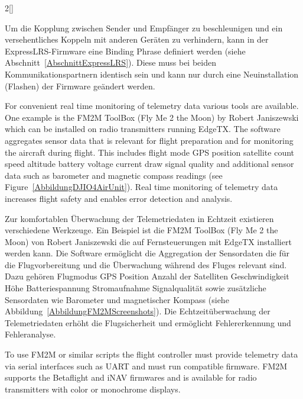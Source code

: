 \begin{paracol}{2}[]
\colger

Um die Kopplung zwischen Sender und Empfänger zu beschleunigen und ein versehentliches Koppeln mit anderen Geräten zu verhindern, kann in der ExpressLRS-Firmware eine Binding Phrase definiert werden (siehe Abschnitt~\ref{AbschnittExpressLRS}). Diese muss bei beiden Kommunikationspartnern identisch sein und kann nur durch eine Neuinstallation (Flashen) der Firmware geändert werden.

\colende

\renewcommand{\deutschertitel}{Überwachung der Telemetriedaten mit geeigneten Werkzeugen}
\renewcommand{\englischertitel}{Monitoring telemetry data with suitable tools}
\makroabschnitt
\label{AbschnittTelemetriedatenFM2MToolBox}

For convenient real time monitoring of telemetry data various tools are available. One example is the FM2M ToolBox (Fly Me 2 the Moon) by Robert Janiszewski which can be installed on radio transmitters running EdgeTX. The software aggregates sensor data that is relevant for flight preparation and for monitoring the aircraft during flight. This includes flight mode GPS position satellite count speed altitude battery voltage current draw signal quality and additional sensor data such as barometer and magnetic compass readings (see Figure~\ref{AbbildungDJIO4AirUnit}). Real time monitoring of telemetry data increases flight safety and enables error detection and analysis.

\colger

Zur komfortablen Überwachung der Telemetriedaten in Echtzeit existieren verschiedene Werkzeuge. Ein Beispiel ist die FM2M ToolBox (Fly Me 2 the Moon) von Robert Janiszewski die auf Fernsteuerungen mit EdgeTX installiert werden kann. Die Software ermöglicht die Aggregation der Sensordaten die für die Flugvorbereitung und die Überwachung während des Fluges relevant sind. Dazu gehören Flugmodus GPS Position Anzahl der Satelliten Geschwindigkeit Höhe Batteriespannung Stromaufnahme Signalqualität sowie zusätzliche Sensordaten wie Barometer und magnetischer Kompass (siehe Abbildung~\ref{AbbildungFM2MScreenshots}). Die Echtzeitüberwachung der Telemetriedaten erhöht die Flugsicherheit und ermöglicht Fehlererkennung und Fehleranalyse.

\coleng

To use FM2M or similar scripts the flight controller must provide telemetry data via serial interfaces such as UART and must run compatible firmware. FM2M supports the Betaflight and iNAV firmwares and is available for radio transmitters with color or monochrome displays.


\end{paracol}
